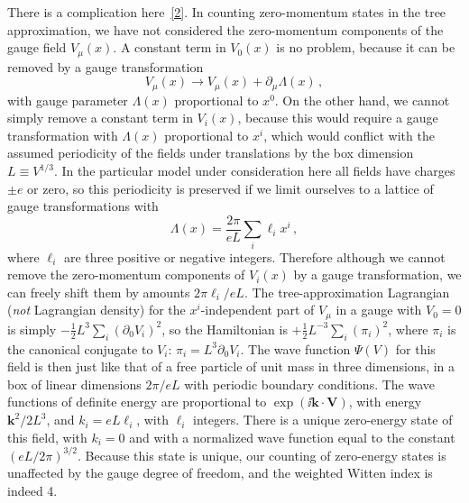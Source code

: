 There is a complication here~\hyperref[ch29-ref-2]{[2]}. In counting
zero-momentum states in the tree approximation, we have not considered the
zero-momentum components of the gauge field \(V_\mu(x)\). A constant term
in \(V_0(x)\) is no problem, because it can be removed by a gauge
transformation
\begin{equation}
  V_\mu(x)\longrightarrow V_\mu(x)+\partial_\mu\Lambda(x)\,,
  \tag{29.4.2}\label{eq:29.4.2}
\end{equation}
with gauge parameter \(\Lambda(x)\) proportional to \(x^0\). On the other
hand, we cannot simply remove a constant term in \(V_i(x)\), because this
would require a gauge transformation with \(\Lambda(x)\) proportional to
\(x^i\), which would conflict with the assumed periodicity of the fields
under translations by the box dimension \(L\equiv V^{1/3}\). In the
particular model under consideration here all fields have charges \(\pm e\)
or zero, so this periodicity is preserved if we limit ourselves to a lattice
of gauge transformations with
\begin{equation}
  \Lambda(x)=\frac{2\pi}{eL}\sum_i\ell_i x^i\,,
  \tag{29.4.3}\label{eq:29.4.3}
\end{equation}
where \(\ell_i\) are three positive or negative integers. Therefore although
we cannot remove the zero-momentum components of \(V_i(x)\) by a gauge
transformation, we can freely shift them by amounts \(2\pi\ell_i/eL\). The
tree-approximation Lagrangian (\emph{not} Lagrangian density) for the
\(x^i\)-independent part of \(V_\mu\) in a gauge with \(V_0=0\) is simply
\(-\frac12L^3\sum_i(\partial_0V_i)^2\), so the Hamiltonian is
\(+\frac12L^{-3}\sum_i(\pi_i)^2\), where \(\pi_i\) is the canonical
conjugate to \(V_i\): \(\pi_i=L^3\partial_0V_i\). The wave function
\(\Psi(V)\) for this field is then just like that of a free particle of unit
mass in three dimensions, in a box of linear dimensions \(2\pi/eL\) with
periodic boundary conditions. The wave functions of definite energy are
proportional to \(\exp(\ii\mathbf{k}\cdot\mathbf{V})\), with energy
\(\mathbf{k}^2/2L^3\), and \(k_i=eL\ell_i\), with \(\ell_i\) integers.
There is a unique zero-energy state of this field, with \(k_i=0\) and with a
normalized wave function equal to the constant \((eL/2\pi)^{3/2}\).
Because this state is unique, our counting of zero-energy states is
unaffected by the gauge degree of freedom, and the weighted Witten index is
indeed 4.

